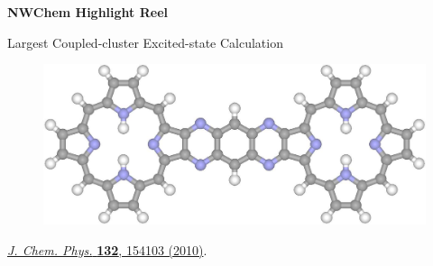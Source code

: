\documentclass[11pt]{beamer}
\begin{document}
  \begin{frame}{} \LARGE
    \begin{center}
        \textbf{NWChem Highlight Reel}
    \end{center}
  \end{frame}

  \begin{frame}{Largest Coupled-cluster Excited-state Calculation} \Large
    \begin{figure}
        \includegraphics[scale=0.27,angle=0]{p2ta.png}
    \end{figure}
    \begin{center}\begin{tiny}
        \href{http://link.aip.org/link/JCPSA6/v132/i15/p154103/s1}{\textit{J. Chem. Phys.} \textbf{132}, 154103 (2010)}.
    \end{tiny}\end{center}
  \end{frame}
\end{document}
